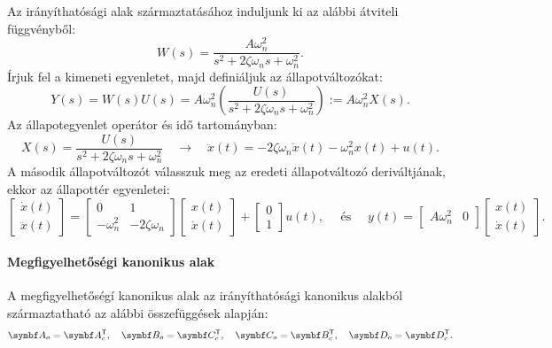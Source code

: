 Az irányíthatósági alak származtatásához induljunk ki az alábbi átviteli
függvényből:
\begin{equation}
  W(s) = \frac{A \omega_n^2}{s^2 + 2\zeta\omega_n s + \omega_n^2}.
\end{equation}
Írjuk fel a kimeneti egyenletet, majd definiáljuk az állapotváltozókat:
\begin{equation}
  Y(s)
  = W(s) U(s)
  = A \omega_n^2 \left(\frac{U(s)}{s^2 + 2 \zeta \omega_n s + \omega_n^2}\right)
  := A \omega_n^2 X(s).
\end{equation}
Az állapotegyenlet operátor és idő tartományban:
\begin{equation}
  X(s)
  = \frac{U(s)}{s^2 + 2 \zeta \omega_n s + \omega_n^2}
  \quad \rightarrow \quad
  \ddot x(t) = -2 \zeta \omega_n \dot x(t) - \omega_n^2 x(t) + u(t).
\end{equation}
A második állapotváltozót válasszuk meg az eredeti állapotváltozó deriváltjának,
ekkor az állapottér egyenletei:
\begin{equation}
  \begin{bmatrix}
    \dot x(t) \\ \ddot x(t)
  \end{bmatrix} = \begin{bmatrix}
    0           & 1                  \\
    -\omega_n^2 & - 2 \zeta \omega_n
  \end{bmatrix} \begin{bmatrix}
    x(t) \\ \dot x(t)
  \end{bmatrix} + \begin{bmatrix}
    0 \\ 1
  \end{bmatrix} u(t),
  \quad \text{ és } \quad
  y(t) = \begin{bmatrix}
    A \omega_n^2 & 0
  \end{bmatrix} \begin{bmatrix}
    x(t) \\ \dot x(t)
  \end{bmatrix}.
\end{equation}

\paragraph{Megfigyelhetőségi kanonikus alak} A megfigyelhetőségí kanonikus alak
az irányíthatósági kanonikus alakból származtatható az alábbi összefüggések
alapján:
\begin{equation}
  \rmat A_o = \rmat A_c^\T, \quad
  \rmat B_o = \rmat C_c^\T, \quad
  \rmat C_o = \rmat B_c^\T, \quad
  \rmat D_o = \rmat D_c^\T.
\end{equation}

\clearpage
